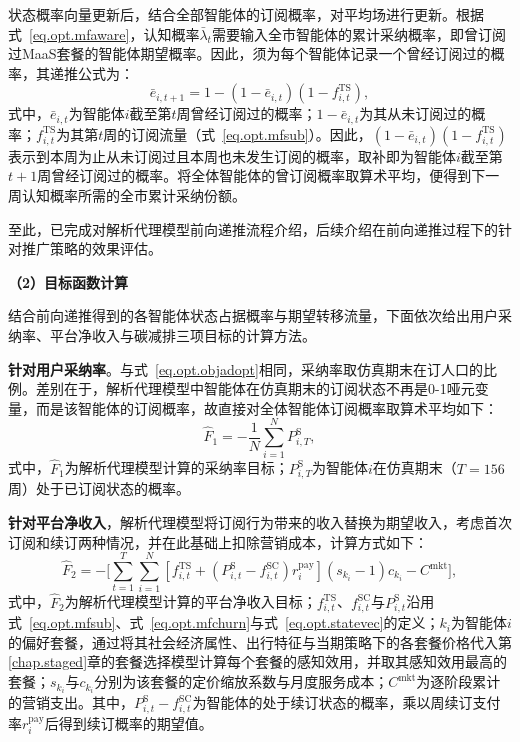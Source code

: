 状态概率向量更新后，结合全部智能体的订阅概率，对平均场进行更新。根据式~\eqref{eq.opt.mfaware}，认知概率$\bar{\lambda}_{t}$需要输入全市智能体的累计采纳概率，即曾订阅过MaaS套餐的智能体期望概率。因此，须为每个智能体记录一个曾经订阅过的概率，其递推公式为：  
\begin{equation}
\bar{e}_{i,t+1}=1-\left(1-\bar{e}_{i,t}\right)\left(1-f_{i,t}^{\mathrm{TS}}\right),
\label{eq.opt.evershare}
\end{equation}
式中，$\bar{e}_{i,t}$为智能体$i$截至第$t$周曾经订阅过的概率；$1-\bar{e}_{i,t}$为其从未订阅过的概率；$f_{i,t}^{\mathrm{TS}}$为其第$t$周的订阅流量（式~\eqref{eq.opt.mfsub}）。因此，$\left(1-\bar{e}_{i,t}\right)\left(1-f_{i,t}^{\mathrm{TS}}\right)$表示到本周为止从未订阅过且本周也未发生订阅的概率，取补即为智能体$i$截至第$t+1$周曾经订阅过的概率。将全体智能体的曾订阅概率取算术平均，便得到下一周认知概率所需的全市累计采纳份额。

至此，已完成对解析代理模型前向递推流程介绍，后续介绍在前向递推过程下的针对推广策略的效果评估。

\textbf{（2）目标函数计算}

结合前向递推得到的各智能体状态占据概率与期望转移流量，下面依次给出用户采纳率、平台净收入与碳减排三项目标的计算方法。

\textbf{针对用户采纳率}。与式~\eqref{eq.opt.objadopt}相同，采纳率取仿真期末在订人口的比例。差别在于，解析代理模型中智能体在仿真期末的订阅状态不再是0-1哑元变量，而是该智能体的订阅概率，故直接对全体智能体订阅概率取算术平均如下：
\begin{equation}
\hat{F}_{1} = -\frac{1}{N}\sum_{i=1}^{N}P_{i,T}^{\mathrm{S}},
\label{eq.opt.analobj}
\end{equation}
式中，$\hat{F}_{1}$为解析代理模型计算的采纳率目标；$P_{i,T}^{\mathrm{S}}$为智能体$i$在仿真期末（$T=156$周）处于已订阅状态的概率。

\textbf{针对平台净收入}，解析代理模型将订阅行为带来的收入替换为期望收入，考虑首次订阅和续订两种情况，并在此基础上扣除营销成本，计算方式如下：
\begin{equation}
\hat{F}_{2} = -\Bigg[\sum_{t=1}^{T}\sum_{i=1}^{N}\left[f_{i,t}^{\mathrm{TS}}+\left(P_{i,t}^{\mathrm{S}}-f_{i,t}^{\mathrm{SC}}\right)r_{i}^{\mathrm{pay}}\right]\left(s_{k_{i}}-1\right)c_{k_{i}}-C^{\mathrm{mkt}}\Bigg],
\label{eq.opt.analrev}
\end{equation}
式中，$\hat{F}_{2}$为解析代理模型计算的平台净收入目标；$f_{i,t}^{\mathrm{TS}}$、$f_{i,t}^{\mathrm{SC}}$与$P_{i,t}^{\mathrm{S}}$沿用式~\eqref{eq.opt.mfsub}、式~\eqref{eq.opt.mfchurn}与式~\eqref{eq.opt.statevec}的定义；$k_{i}$为智能体$i$的偏好套餐，通过将其社会经济属性、出行特征与当期策略下的各套餐价格代入第\ref{chap.staged}章的套餐选择模型计算每个套餐的感知效用，并取其感知效用最高的套餐；$s_{k_{i}}$与$c_{k_{i}}$分别为该套餐的定价缩放系数与月度服务成本；$C^{\mathrm{mkt}}$为逐阶段累计的营销支出。其中，$P_{i,t}^{\mathrm{S}}-f_{i,t}^{\mathrm{SC}}$为智能体的处于续订状态的概率，乘以周续订支付率$r_{i}^{\mathrm{pay}}$后得到续订概率的期望值。

